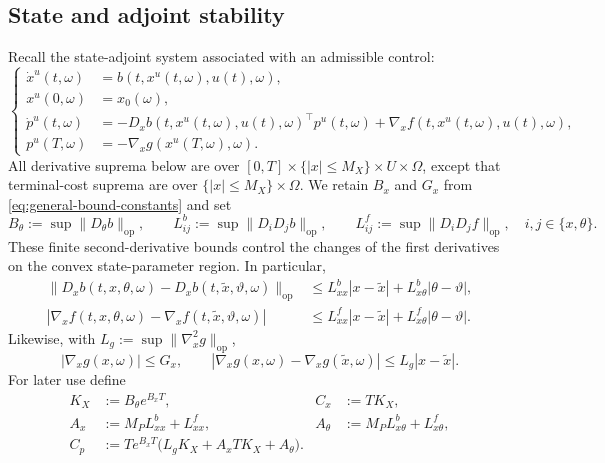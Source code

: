 \documentclass[11pt]{amsart}
\numberwithin{equation}{section} %
\theoremstyle{remark}
\begin{document}
\subsection{State and adjoint stability}
\label{subsec:ensemble-stability}

Recall the state-adjoint system associated with an admissible control:
\begin{equation}
\label{eq:ensemble-state-adjoint-u}
\left\{\begin{aligned}
\dot x^u(t,\omega)&=b(t,x^u(t,\omega),u(t),\omega),\\
x^u(0,\omega)&=x_0(\omega),\\
\dot p^u(t,\omega)&=-D_x b(t,x^u(t,\omega),u(t),\omega)^\top p^u(t,\omega)
+\nabla_x f(t,x^u(t,\omega),u(t),\omega),\\
p^u(T,\omega)&=-\nabla_xg(x^u(T,\omega),\omega).
\end{aligned}\right.
\end{equation}
All derivative suprema below are over
$[0,T]\times\{|x|\le M_X\}\times U\times\Omega$, except that
terminal-cost suprema are over $\{|x|\le M_X\}\times\Omega$.
We retain $B_x$ and $G_x$ from \eqref{eq:general-bound-constants} and set
\begin{equation}
\label{eq:ensemble-convergence-bounds}
B_\theta:=\sup\|D_\theta b\|_{\mathrm{op}},
\qquad
L_{ij}^{b}:=\sup\|D_iD_jb\|_{\mathrm{op}},
\qquad
L_{ij}^{f}:=\sup\|D_iD_jf\|_{\mathrm{op}},
\quad i,j\in\{x,\theta\}.
\end{equation}
These finite second-derivative bounds control the changes of the
first derivatives on the convex state-parameter region. In particular,
\begin{align}
\label{eq:ensemble-convergence-lipschitz}
\|D_x b(t,x,\theta,\omega)-D_x b(t,\widetilde x,\vartheta,\omega)\|_{\mathrm{op}}
&\le L_{xx}^b|x-\widetilde x|+L_{x\theta}^b|\theta-\vartheta|,\\
|\nabla_xf(t,x,\theta,\omega)-\nabla_xf(t,\widetilde x,\vartheta,\omega)|
&\le L_{xx}^f|x-\widetilde x|+L_{x\theta}^f|\theta-\vartheta|.\nonumber
\end{align}
Likewise, with $L_g:=\sup\|\nabla_x^2g\|_{\mathrm{op}}$,
\begin{equation}
\label{eq:terminal-gradient-lipschitz}
|\nabla_xg(x,\omega)|\le G_x,\qquad
|\nabla_xg(x,\omega)-\nabla_xg(\widetilde x,\omega)|\le L_g|x-\widetilde x|.
\end{equation}
For later use define
\begin{align}
\label{eq:general-stability-constants}
K_X&:=B_\theta e^{B_xT},& C_x&:=TK_X,\nonumber\\
A_x&:=M_PL_{xx}^b+L_{xx}^f,&
A_\theta&:=M_PL_{x\theta}^b+L_{x\theta}^f,\\
C_p&:=Te^{B_xT}\bigl(L_gK_X+A_xTK_X+A_\theta\bigr).&&\nonumber
\end{align}
\end{document}

